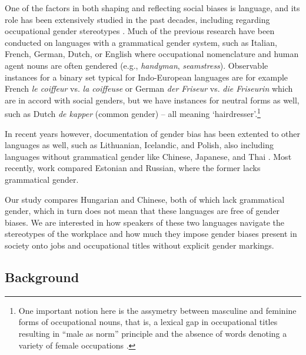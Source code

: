 \documentclass[11pt]{article}
\begin{document}
One of the factors in both shaping and reflecting social biases is language, and its role has been extensively studied in the past decades, including regarding occupational gender stereotypes \citep[cf.][]{sabatini_1985_occupational,pauwels_1997_handymen,gygax_2008_generically,lewis_2020_gender,kaukonen_2025_gender}. Much of the previous research have been conducted on languages with a grammatical gender system, such as Italian, French, German, Dutch, or English where occupational nomenclature and human agent nouns are often gendered (e.g., \textit{handyman}, \textit{seamstress}). 
Observable instances for a binary set typical for Indo-European languages are for example French \textit{le coiffeur} vs. \textit{la coiffeuse} or German \textit{der Friseur} vs. \textit{die Friseurin} which are in accord with social genders, but we have instances for neutral forms as well, such as Dutch \textit{de kapper} (common gender) -- all meaning `hairdresser'.\footnote{One important notion here is the assymetry between masculine and feminine forms of occupational nouns, that is, a lexical gap in occupational titles resulting in ``male as norm'' principle and the absence of words denoting a variety of female occupations \citep{baron_1986_grammar,hellinger_1990_kontrastive,sabatini_1985_occupational,yaguello_1978_mots,pauwels_2003_linguistic}.}


In recent years however, documentation of gender bias has been extented to other languages as well, such as Lithuanian, Icelandic, and Polish, also including languages without grammatical gender like Chinese, Japanese, and Thai \citep[see][]{hellinger_2003_gender,pauwels_1998_women,pauwels_2003_linguistic}. Most recently,  work compared Estonian and Russian, where the former lacks grammatical gender.

Our study compares Hungarian and Chinese, both of which lack grammatical gender, which in turn does not mean that these languages are free of gender biases. We are interested in how speakers of these two languages navigate the stereotypes of the workplace and how much they impose gender biases present in society onto jobs and occupational titles without explicit gender markings.

\subsection{Background}
\end{document}
